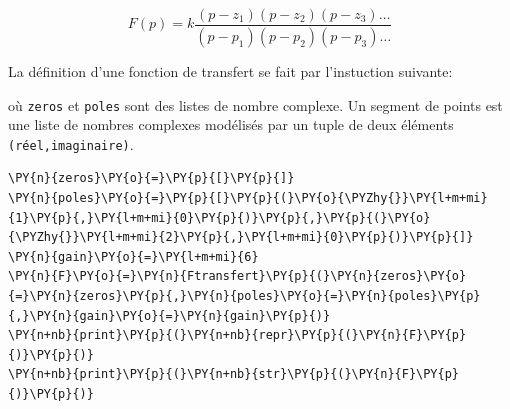 \[
F(p)=k\dfrac{(p-z_1)(p-z_2)(p-z_3)\ldots}{(p-p_1)(p-p_2)(p-p_3)\ldots}
\]

La définition d'une fonction de transfert se fait par l'instuction
suivante:

\begin{Shaded}
\begin{Highlighting}[]
\OperatorTok{=}\NormalTok{[(}\NormalTok{,}\NormalTok{)]  }
\OperatorTok{=}\NormalTok{[(}\OperatorTok{-}\NormalTok{,}\NormalTok{),(}\OperatorTok{-}\NormalTok{,}\NormalTok{)]}
\OperatorTok{=}
\OperatorTok{=}\OperatorTok{=}\OperatorTok{=}\OperatorTok{=}
\end{Highlighting}
\end{Shaded}

où \texttt{zeros} et \texttt{poles} sont des listes de nombre complexe.
Un segment de points est une liste de nombres complexes modélisés par un
tuple de deux éléments \texttt{(réel,imaginaire)}.

\begin{tcolorbox}[breakable, size=fbox, boxrule=1pt, pad at break*=1mm,colback=cellbackground, colframe=cellborder]
\begin{Verbatim}[commandchars=\\\{\}]
\PY{n}{zeros}\PY{o}{=}\PY{p}{[}\PY{p}{]}  
\PY{n}{poles}\PY{o}{=}\PY{p}{[}\PY{p}{(}\PY{o}{\PYZhy{}}\PY{l+m+mi}{1}\PY{p}{,}\PY{l+m+mi}{0}\PY{p}{)}\PY{p}{,}\PY{p}{(}\PY{o}{\PYZhy{}}\PY{l+m+mi}{2}\PY{p}{,}\PY{l+m+mi}{0}\PY{p}{)}\PY{p}{]}
\PY{n}{gain}\PY{o}{=}\PY{l+m+mi}{6}
\PY{n}{F}\PY{o}{=}\PY{n}{Ftransfert}\PY{p}{(}\PY{n}{zeros}\PY{o}{=}\PY{n}{zeros}\PY{p}{,}\PY{n}{poles}\PY{o}{=}\PY{n}{poles}\PY{p}{,}\PY{n}{gain}\PY{o}{=}\PY{n}{gain}\PY{p}{)}
\PY{n+nb}{print}\PY{p}{(}\PY{n+nb}{repr}\PY{p}{(}\PY{n}{F}\PY{p}{)}\PY{p}{)}
\PY{n+nb}{print}\PY{p}{(}\PY{n+nb}{str}\PY{p}{(}\PY{n}{F}\PY{p}{)}\PY{p}{)}
\end{Verbatim}
\end{tcolorbox}

